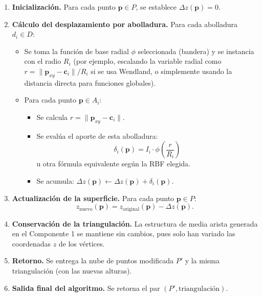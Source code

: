 \documentclass[12pt, letterpaper]{article}
\begin{document}
\begin{enumerate}
    \item \textbf{Inicialización.}  
    Para cada punto \(\mathbf{p} \in P\), se establece \(\Delta z(\mathbf{p}) = 0\).

    \item \textbf{Cálculo del desplazamiento por abolladura.}  
    Para cada abolladura \(d_i \in D\):
    \begin{itemize}
        \item Se toma la función de base radial \(\phi\) seleccionada (bandera) y se instancia con el radio \(R_i\) (por ejemplo, escalando la variable radial como \(r = \|\mathbf{p}_{xy} - \mathbf{c}_i\| / R_i\) si se usa Wendland, o simplemente usando la distancia directa para funciones globales).
        \item Para cada punto \(\mathbf{p} \in A_i\):
        \begin{itemize}
            \item Se calcula \(r = \|\mathbf{p}_{xy} - \mathbf{c}_i\|\).
            \item Se evalúa el aporte de esta abolladura:
            \[
            \delta_i(\mathbf{p}) = I_i \cdot \phi\!\left(\frac{r}{R_i}\right)
            \]
            u otra fórmula equivalente según la RBF elegida.
            \item Se acumula: \(\Delta z(\mathbf{p}) \leftarrow \Delta z(\mathbf{p}) + \delta_i(\mathbf{p})\).
        \end{itemize}
    \end{itemize}

    \item \textbf{Actualización de la superficie.}  
    Para cada punto \(\mathbf{p} \in P\):
    \[
    z_{\text{nuevo}}(\mathbf{p}) = z_{\text{original}}(\mathbf{p}) - \Delta z(\mathbf{p}).
    \]

    \item \textbf{Conservación de la triangulación.}  
    La estructura de media arista generada en el Componente 1 se mantiene sin cambios, pues solo han variado las coordenadas \(z\) de los vértices.

    \item \textbf{Retorno.}  
    Se entrega la nube de puntos modificada \(P'\) y la misma triangulación (con las nuevas alturas).

    \item \textbf{Salida final del algoritmo.}  
    Se retorna el par \((P', \text{triangulación})\).
\end{enumerate}
\end{document}
